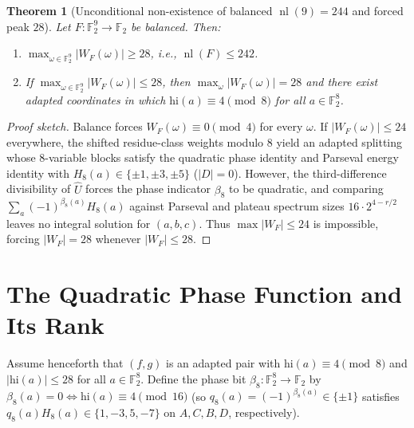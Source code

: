 \documentclass[11pt]{article}
\newtheorem{theorem}{Theorem}[section]
\theoremstyle{definition}
\newcommand{\F}{\mathbb{F}}
\newcommand{\nl}{\operatorname{nl}}
\begin{document}
\begin{theorem}[Unconditional non-existence of balanced $\nl(9) = 244$ and forced peak $28$]
\label{thm:no244}
Let $F : \F_2^9 \to \F_2$ be balanced. Then:
\begin{enumerate}[nosep]
  \item $\max_{\omega \in \F_2^9} |W_F(\omega)| \ge 28$, i.e., $\nl(F) \le 242$.
  \item If $\max_{\omega \in \F_2^9} |W_F(\omega)| \le 28$, then $\max_{\omega} |W_F(\omega)| = 28$ and there exist adapted coordinates in which $\mathrm{hi}(a) \equiv 4 \pmod 8$ for all $a \in \F_2^8$.
\end{enumerate}
\end{theorem}
\begin{proof}[Proof sketch]
Balance forces $W_F(\omega) \equiv 0 \pmod 4$ for every $\omega$. If $|W_F(\omega)| \le 24$ everywhere, the shifted residue-class weights modulo $8$ yield an adapted splitting whose $8$-variable blocks satisfy the quadratic phase identity and Parseval energy identity with $H_8(a) \in \{\pm 1, \pm 3, \pm 5\}$ ($|D| = 0$). However, the third-difference divisibility of $\widehat{U}$ forces the phase indicator $\beta_8$ to be quadratic, and comparing $\sum_a (-1)^{\beta_8(a)} H_8(a)$ against Parseval and plateau spectrum sizes $16 \cdot 2^{4-r/2}$ leaves no integral solution for $(a, b, c)$. Thus $\max |W_F| \le 24$ is impossible, forcing $|W_F| = 28$ whenever $|W_F| \le 28$.
\end{proof}

\section{The Quadratic Phase Function and Its Rank}
\label{sec:phase-geometry}

Assume henceforth that $(f, g)$ is an adapted pair with $\mathrm{hi}(a) \equiv 4 \pmod 8$ and $|\mathrm{hi}(a)| \le 28$ for all $a \in \F_2^8$.
Define the phase bit $\beta_8 : \F_2^8 \to \F_2$ by $\beta_8(a) = 0 \iff \mathrm{hi}(a) \equiv 4 \pmod{16}$ (so $q_8(a) = (-1)^{\beta_8(a)} \in \{\pm 1\}$ satisfies $q_8(a) H_8(a) \in \{1, -3, 5, -7\}$ on $A, C, B, D$, respectively).
\end{document}
